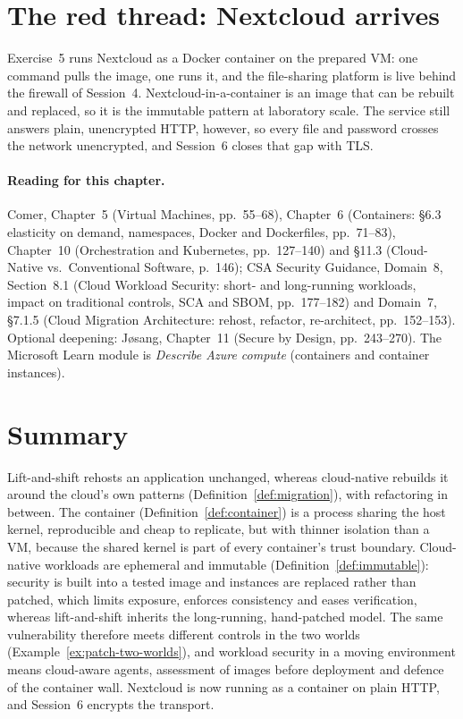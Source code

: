 \section{The red thread: Nextcloud arrives}

Exercise~5 runs Nextcloud as a Docker container on the prepared VM: one
command pulls the image, one runs it, and the file-sharing platform is live
behind the firewall of Session~4. Nextcloud-in-a-container is an image that
can be rebuilt and replaced, so it is the immutable pattern at laboratory
scale. The service still answers plain, unencrypted HTTP, however, so every
file and password crosses the network unencrypted, and Session~6 closes
that gap with TLS.

\paragraph{Reading for this chapter.} Comer, Chapter~5 (Virtual Machines,
pp.~55--68), Chapter~6 (Containers: \S6.3 elasticity on demand, namespaces,
Docker and Dockerfiles, pp.~71--83), Chapter~10 (Orchestration and Kubernetes,
pp.~127--140) and \S11.3 (Cloud-Native vs.\ Conventional Software, p.~146);
CSA Security Guidance, Domain~8, Section~8.1 (Cloud Workload Security: short-
and long-running workloads, impact on traditional controls, SCA and SBOM,
pp.~177--182) and Domain~7, \S7.1.5 (Cloud Migration Architecture: rehost,
refactor, re-architect, pp.~152--153). Optional deepening: J\o sang,
Chapter~11 (Secure by Design, pp.~243--270). The Microsoft Learn module is \emph{Describe
Azure compute} (containers and container instances).

\section{Summary}

Lift-and-shift rehosts an application unchanged, whereas cloud-native
rebuilds it around the cloud's own patterns (Definition~\ref{def:migration}),
with refactoring in between. The container (Definition~\ref{def:container})
is a process sharing the host kernel, reproducible and cheap to replicate,
but with thinner isolation than a VM, because the shared kernel is part of
every container's trust boundary. Cloud-native workloads are ephemeral and
immutable (Definition~\ref{def:immutable}): security is built into a tested
image and instances are replaced rather than patched, which limits exposure,
enforces consistency and eases verification, whereas lift-and-shift inherits
the long-running, hand-patched model. The same vulnerability therefore meets
different controls in the two worlds (Example~\ref{ex:patch-two-worlds}), and
workload security in a moving environment means cloud-aware agents,
assessment of images before deployment and defence of the container wall.
Nextcloud is now running as a container on plain HTTP, and Session~6
encrypts the transport.

